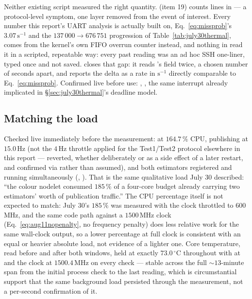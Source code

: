 Neither existing script measured the right quantity.
 (item 19) counts 
lines in  --- a protocol-level symptom, one layer removed
from the event of interest. Every number this report's UART analysis is
actually built on, Eq.~\ref{eq:missprob}'s $3.07\,\mathrm{s}^{-1}$ and the
$137\,000 \to 676\,751$ progression of Table~\ref{tab:july30thermal}, comes
from the kernel's own FIFO overrun counter instead, and nothing in
 read it in a scripted, repeatable way: every past reading was
an ad hoc SSH one-liner, typed once and not saved. 
closes that gap: it reads 's  field
twice, a chosen number of seconds apart, and reports the delta as a rate in
$\mathrm{s}^{-1}$ directly comparable to Eq.~\ref{eq:missprob}. Confirmed
live before use: , , the same interrupt
already implicated in \S\ref{sec:july30thermal}'s deadline model.

\subsection{Matching the load}

Checked live immediately before the measurement: 
at $164.7\,\%$ CPU,  publishing at
$15.0$\,Hz (not the $4$\,Hz throttle applied for the Test1/Test2 protocol
elsewhere in this report --- reverted, whether deliberately or as a side
effect of a later restart, and confirmed via  rather than
assumed), and both estimators registered and running simultaneously
(, ). That is the same qualitative
load July 30 described: ``the colour nodelet consumed $185\,\%$ of a
four-core budget already carrying two estimators' worth of publication
traffic.'' The CPU percentage itself is not expected to match: July 30's
$185\,\%$ was measured with the clock throttled to $600$\,MHz, and the same
code path against a $1500$\,MHz clock (Eq.~\ref{eq:aug11nopenalty}, no
frequency penalty) does less relative work for the same wall-clock output,
so a lower percentage at full clock is consistent with an equal or heavier
absolute load, not evidence of a lighter one. Core temperature, read before
and after both windows, held at exactly $73.0\,^\circ$C throughout with
 at  and the clock at $1500.4$\,MHz on every
check --- stable across the full $\sim13$-minute span from the initial
process check to the last reading, which is circumstantial support that the
same background load persisted through the measurement, not a
per-second confirmation of it.

